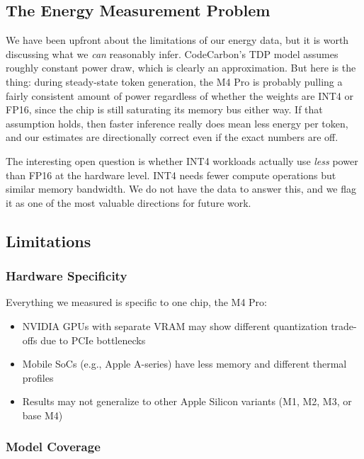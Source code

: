 \documentclass[11pt,a4paper]{article}
\begin{document}
\subsection{The Energy Measurement Problem}

We have been upfront about the limitations of our energy data, but it is worth discussing what we \textit{can} reasonably infer. CodeCarbon's TDP model assumes roughly constant power draw, which is clearly an approximation. But here is the thing: during steady-state token generation, the M4 Pro is probably pulling a fairly consistent amount of power regardless of whether the weights are INT4 or FP16, since the chip is still saturating its memory bus either way. If that assumption holds, then faster inference really does mean less energy per token, and our estimates are directionally correct even if the exact numbers are off.

The interesting open question is whether INT4 workloads actually use \textit{less} power than FP16 at the hardware level. INT4 needs fewer compute operations but similar memory bandwidth. We do not have the data to answer this, and we flag it as one of the most valuable directions for future work.

\subsection{Limitations}

\subsubsection{Hardware Specificity}

Everything we measured is specific to one chip, the M4 Pro:

\begin{itemize}[leftmargin=*,nosep]
    \item NVIDIA GPUs with separate VRAM may show different quantization trade-offs due to PCIe bottlenecks
    \item Mobile SoCs (e.g., Apple A-series) have less memory and different thermal profiles
    \item Results may not generalize to other Apple Silicon variants (M1, M2, M3, or base M4)
\end{itemize}

\subsubsection{Model Coverage}
\end{document}
